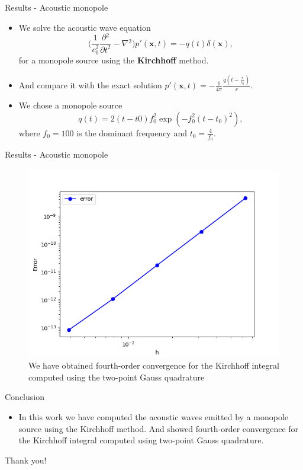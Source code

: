 \documentclass[10pt, aspectratio=169]{beamer}
\begin{document}
\begin{frame}{Results - Acoustic monopole}
	\begin{itemize}
		\item We solve the acoustic wave equation
		\begin{equation}
			\Bigg( \frac{1}{c_{0}^2}\frac{\partial{}^{2}}{\partial{t}^{2}}- \nabla{}^{2} \Bigg) p'(\mathbf{x}, t)  = -q(t)\delta(\mathbf{x}), 
		\end{equation}
		for a monopole source using the \textbf{Kirchhoff} method.
		\item And compare it with the exact solution $p'(\mathbf{x}, t) = -\frac{1}{4\pi} \frac{  q(t - \frac{r}{c_{0}}) }{r}$.
		\item We chose a monopole source
		\begin{equation}
			q(t) = 2(t - t0)f_{0}^{2}\exp( -f_{0}^2(t - t_{0})^{2}), 
		\end{equation}
		where $f_{0} = 100$ is the dominant frequency and $t_{0} = \frac{4}{f_{0}}$.
	\end{itemize}
\end{frame}

\begin{frame}{Results - Acoustic monopole}
	\begin{figure}
		\centering
		\includegraphics[scale=0.5]{images/convergence.png}
		\caption{We have obtained fourth-order convergence for the Kirchhoff integral computed using the two-point Gauss quadrature}
	\end{figure}
\end{frame}

\begin{frame}{Conclusion}
	\begin{itemize}
		\item In this work we have computed the acoustic waves emitted by a monopole source using the Kirchhoff method. And showed fourth-order convergence for the Kirchhoff integral computed using two-point Gauss quadrature.
	\end{itemize}
\end{frame}

\begin{frame}[standout]
	Thank you!
\end{frame}
\end{document}
